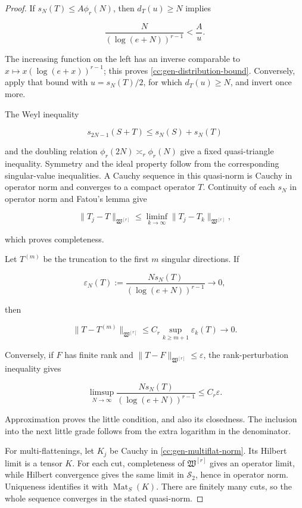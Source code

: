 \documentclass[10pt,reqno]{amsart}
\theoremstyle{plain}
\theoremstyle{definition}
\theoremstyle{remark}
\begin{document}
\begin{proof}
If \(s_N(T)\leq A\phi_r(N)\), then \(d_T(u)\geq N\) implies

\[
 \frac{N}{(\log(e+N))^{r-1}}<\frac Au.
\]

The increasing function on the left has an inverse comparable to
\(x\mapsto x(\log(e+x))^{r-1}\); this proves
\eqref{cc:gen-distribution-bound}.  Conversely, apply that bound with
\(u=s_N(T)/2\), for which \(d_T(u)\geq N\), and invert once more.

The Weyl inequality

\[
 s_{2N-1}(S+T)\leq s_N(S)+s_N(T)
\]

and the doubling relation \(\phi_r(2N)\asymp_r\phi_r(N)\) give a fixed
quasi-triangle inequality.  Symmetry and the ideal property follow from the
corresponding singular-value inequalities.  A Cauchy sequence in this
quasi-norm is Cauchy in operator norm and converges to a compact operator
\(T\).  Continuity of each \(s_N\) in operator norm and Fatou's lemma give

\[
 \|T_j-T\|_{\mathfrak W^{[r]}}
 \leq\liminf_{k\to\infty}
 \|T_j-T_k\|_{\mathfrak W^{[r]}},
\]

which proves completeness.

Let \(T^{(m)}\) be the truncation to the first \(m\) singular directions.
If

\[
 \varepsilon_N(T):=\frac{Ns_N(T)}{(\log(e+N))^{r-1}}\longrightarrow0,
\]

then

\[
 \|T-T^{(m)}\|_{\mathfrak W^{[r]}}
 \leq C_r\sup_{k\geq m+1}\varepsilon_k(T)\longrightarrow0.
\]

Conversely, if \(F\) has finite rank and
\(\|T-F\|_{\mathfrak W^{[r]}}\leq\varepsilon\), the rank-perturbation
inequality gives

\[
 \limsup_{N\to\infty}
 \frac{Ns_N(T)}{(\log(e+N))^{r-1}}
 \leq C_r\varepsilon.
\]

Approximation proves the little condition, and also its closedness.  The
inclusion into the next little grade follows from the extra logarithm in the
denominator.

For multi-flattenings, let \(K_j\) be Cauchy in
\eqref{cc:gen-multiflat-norm}.  Its Hilbert limit is a tensor \(K\).  For
each cut, completeness of \(\mathfrak W^{[r]}\) gives an operator limit,
while Hilbert convergence gives the same limit in \(\mathcal S_2\), hence
in operator norm.  Uniqueness identifies it with
\(\operatorname{Mat}_S(K)\).  There are finitely many cuts, so the whole
sequence converges in the stated quasi-norm.


\end{proof}
\end{document}
